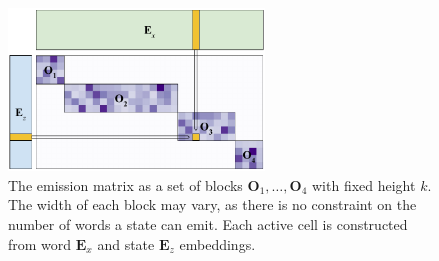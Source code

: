 \documentclass[11pt,a4paper]{article}
\begin{document}
\begin{figure}[t]
\centering
\includegraphics[height=1.7in]{img/blocksparse_mat_no_block.pdf}
\caption{\label{fig:emit}
The emission matrix as a set of blocks $\mathbf{O}_1, \ldots, \mathbf{O}_4$
with fixed height $k$.
The width of each block may vary, as there is no constraint on the number of words
a state can emit.
Each active cell is constructed from word $\mathbf{E}_x$ and state $\mathbf{E}_z$
embeddings.
}
\end{figure}
\end{document}
